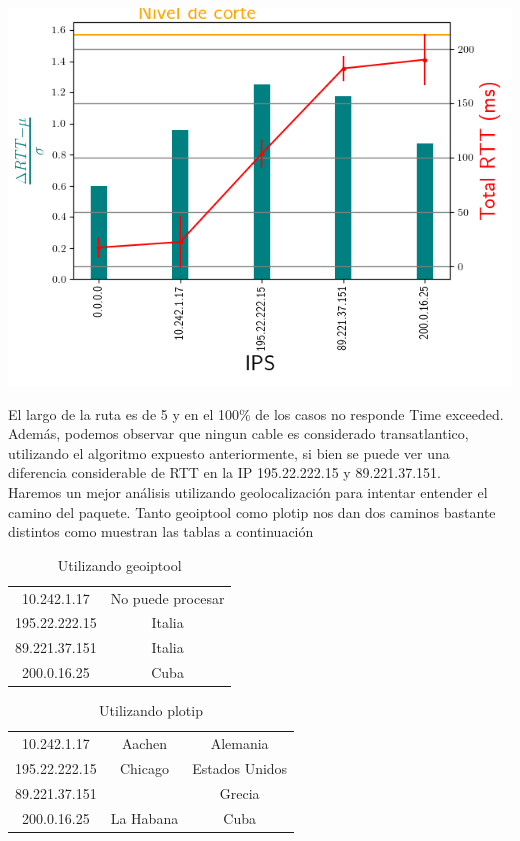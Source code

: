  \includegraphics[scale=0.8]{imagenes/rtts_habana.png}

El largo de la ruta es de 5 y en el 100\% de los casos no responde Time exceeded. Adem\'as, podemos observar que ningun cable es considerado transatlantico, utilizando el algoritmo expuesto anteriormente, si bien se puede ver una diferencia considerable de RTT en la IP 195.22.222.15 y 89.221.37.151.  \\

Haremos un mejor an\'alisis utilizando geolocalizaci\'on para intentar entender el camino del paquete. Tanto geoiptool como plotip nos dan dos caminos bastante distintos como muestran las tablas a continuaci\'on
 
\begin{table}
\centering
\begin{tabular}{|c|c|}
10.242.1.17 & No puede procesar \\
195.22.222.15 & Italia  \\
89.221.37.151 & Italia \\
200.0.16.25 & Cuba \\
\end{tabular}
\caption{Utilizando geoiptool}
\end{table}

\begin{table}
\centering
\begin{tabular}{|c|c|c|}
10.242.1.17 & Aachen & Alemania \\
195.22.222.15 & Chicago & Estados Unidos  \\
89.221.37.151 &  & Grecia \\
200.0.16.25 & La Habana & Cuba \\
\end{tabular}
\caption{Utilizando plotip}
\end{table}

